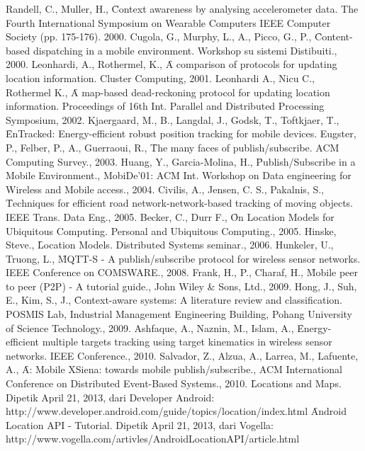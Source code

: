 \begin{thebibliography}{100}
    \setlength{\itemindent}{-1cm}
    \setlength\itemsep{0pt}
    \setlength{\parskip}{0pt}

     Randell, C., Muller, H., \f{Context awareness by analysing accelerometer
        data}. The Fourth International Symposium on Wearable Computers IEEE Computer
        Society (pp. 175-176). 2000.
     Cugola, G., Murphy, L., A., Picco, G., P., \f{Content-based
        dispatching in a mobile environment}. Workshop su
        sistemi Distibuiti., 2000.
     Leonhardi, A., Rothermel, K., \f{A comparison of protocols for updating
        location information}. Cluster Computing, 2001.
     Leonhardi A., Nicu C., Rothermel K., \f{A map-based dead-reckoning
        protocol for updating location information}. Proceedings of 16th Int. Parallel and
        Distributed Processing Symposium, 2002.
     Kjaergaard, M., B., Langdal, J., Godsk, T., Toftkjaer, T., \f{EnTracked:
        Energy-efficient robust position tracking for mobile devices}.
     Eugster, P., Felber, P., A., Guerraoui, R., \f{The many faces of
        publish/subscribe}. ACM Computing Survey., 2003.
     Huang, Y., Garcia-Molina, H., \f{Publish/Subscribe in a Mobile
        Environment}., MobiDe'01: ACM Int.
        Workshop on Data engineering for Wireless and Mobile access., 2004.
     Civilis, A., Jensen, C. S., Pakalnis, S., \f{Techniques for efficient
        road network-network-based tracking of moving objects}. IEEE Trans. Data Eng., 2005.
     Becker, C., Durr F., \f{On Location Models for Ubiquitous Computing}.
        Personal and Ubiquitous Computing., 2005.
     Hinske, Steve., \f{Location Models}. Distributed Systems seminar., 2006.
     Hunkeler, U., Truong, L., \f{MQTT-S - A publish/subscribe protocol
        for wireless sensor networks}. IEEE Conference on COMSWARE., 2008.
     Frank, H., P., Charaf, H., \f{Mobile peer to peer (P2P) - A tutorial guide}.,
        John Wiley \& Sons, Ltd., 2009.
     Hong, J., Suh, E., Kim, S., J., \f{Context-aware systems: A literature
        review and classification}. POSMIS Lab, Industrial Management Engineering Building,
        Pohang University of Science Technology., 2009.
     Ashfaque, A., Naznin, M., Islam, A., \f{Energy-efficient multiple
        targets tracking using target kinematics in wireless sensor networks}. IEEE
        Conference., 2010.
     Salvador, Z., Alzua, A., Larrea, M., Lafuente, A.,
        \f{A: Mobile XSiena: towards mobile publish/subscribe}., ACM
        International Conference on Distributed Event-Based Systems., 2010.
     \f{Locations and Maps}. Dipetik April 21, 2013, dari Developer Android:
        http://www.developer.android.com/guide/topics/location/index.html
     \f{Android Location API - Tutorial}. Dipetik April 21, 2013, dari Vogella:
        http://www.vogella.com/artivles/AndroidLocationAPI/article.html

\end{thebibliography}
